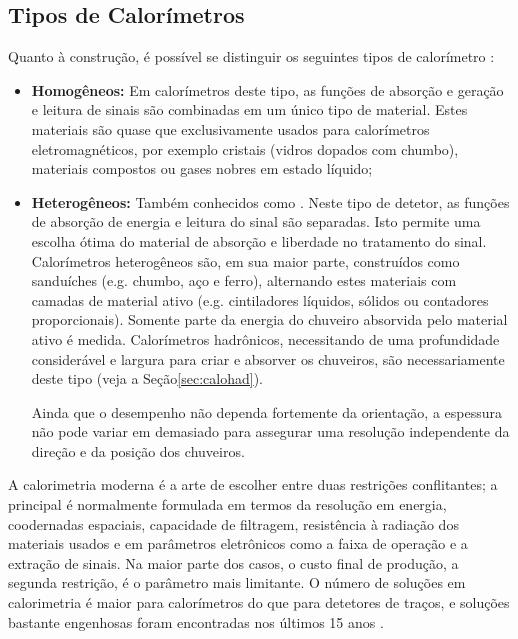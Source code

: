 \subsection{Tipos de Calorímetros}

Quanto à construção, é possível se distinguir os seguintes tipos de
calorímetro \cite{bock:detector, hadcal}:

\begin{itemize}
  \item \textbf{Homogêneos:} Em calorímetros
  deste tipo, as funções de absorção e geração e leitura de sinais são
  combinadas em um único tipo de material. Estes materiais são quase que
  exclusivamente usados para calorímetros eletromagnéticos, por exemplo
  cristais (vidros dopados com chumbo), materiais compostos ou gases nobres em
  estado líquido;

  \item \textbf{Heterogêneos:} Tam\-bém
  conhecidos como . Neste tipo de
  detetor, as fun\-ções de ab\-sor\-ção de energia e leitura do sinal são
  separadas. Isto permite uma escolha ótima do material de absorção e
  liberdade no tratamento do sinal. Calorímetros heterogêneos são, em sua
  maior parte, construídos como sanduíches (e.g. chumbo, aço e ferro),
  alternando estes materiais com camadas de material ativo (e.g. cintiladores
  líquidos, sólidos ou contadores proporcionais). Somente parte da energia do
  chuveiro absorvida pelo material ativo é medida. Calorímetros hadrônicos,
  necessitando de uma profundidade considerável e largura para criar e
  absorver os chuveiros, são necessariamente deste tipo (veja a
  Seção\ref{sec:calohad}).

  Ainda que o desempenho não dependa fortemente da orientação, a espessura não
  pode variar em demasiado para assegurar uma resolução independente da
  direção e da posição dos chuveiros.
\end{itemize}

A calorimetria moderna é a arte de escolher entre duas restrições
conflitantes; a principal é normalmente formulada em termos da resolução em
energia, coodernadas espaciais, capacidade de filtragem, resistência à
radiação dos materiais usados e em parâmetros eletrônicos como a faixa de
operação e a extração de sinais. Na maior parte dos casos, o custo final de
produção, a segunda restrição, é o parâmetro mais limitante. O número de
soluções em calorimetria é maior para calorímetros do que para detetores de
traços, e soluções bastante engenhosas foram encontradas nos últimos 15 anos
\cite{hadcal}.

